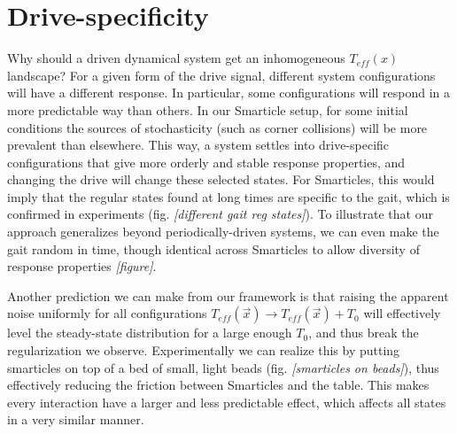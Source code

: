 \documentclass[reprint,prx]{revtex4-1}
\renewcommand{\v}[1]{\ensuremath{\vec{#1}}} %
\renewcommand{\=}[1]{\stackrel{#1}{=}} %
\renewcommand{\(}{\left (}
\renewcommand{\)}{\right  )}
\renewcommand{\[}{\left [}
\renewcommand{\]}{\right ]}
\newcommand{\<}{\left <}
\renewcommand{\>}{\right >}
\theoremstyle{definition}
\theoremstyle{remark}
\renewcommand{\todo}[1]{\textit{\color{red}[#1]}}
\begin{document}
\section{Drive-specificity}
Why should a driven dynamical system get an inhomogeneous $ T_{eff}(x) $ landscape? For a given form of the drive signal, different system configurations will have a different response. In particular, some configurations will respond in a more predictable way than others. In our Smarticle setup, for some initial conditions the sources of stochasticity (such as corner collisions) will be more prevalent than elsewhere. This way, a system settles into drive-specific configurations that give more orderly and stable response properties, and changing the drive will change these selected states. For Smarticles, this would imply that the regular states found at long times are specific to the gait, which is confirmed in experiments (fig. \todo{different gait reg states}). To illustrate that our approach generalizes beyond periodically-driven systems, we can even make the gait random in time, though identical across Smarticles to allow diversity of response properties \todo{figure}.

Another prediction we can make from our framework is that raising the apparent noise uniformly for all configurations $ T_{eff}(\v{x}) \rightarrow T_{eff}(\v{x})+T_0$ will effectively level the steady-state distribution for a large enough $ T_0 $, and thus break the regularization we observe. Experimentally we can realize this by putting smarticles on top of a bed of small, light beads (fig. \todo{smarticles on beads}), thus effectively reducing the friction between Smarticles and the table. This makes every interaction have a larger and less predictable effect, which affects all states in a very similar manner.
\end{document}
